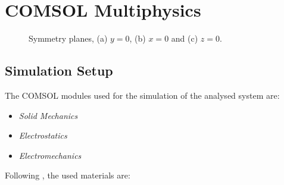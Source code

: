 \documentclass[lettersize,journal]{IEEEtran}
\begin{document}
    \section{COMSOL Multiphysics}
    \begin{figure}[!ht]
        \centering
        \hfil
        \hfil
        \caption{Symmetry planes, (a) \(y=0\), (b) \(x=0\) and (c) \(z=0\).}
        \label{fig:symmetry-planes}
    \end{figure}
    \subsection{Simulation Setup}
        The COMSOL modules used for the simulation of the analysed system are:
        \begin{itemize}
            \item \textit{Solid Mechanics}
            \item \textit{Electrostatics}
            \item \textit{Electromechanics}        
        \end{itemize}
        Following \cite{original}, the used materials are:
        
\end{document}
